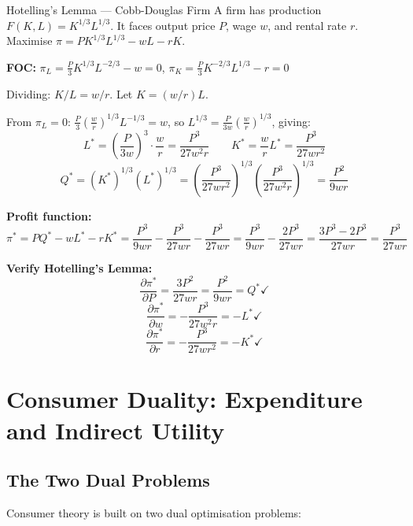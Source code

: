 \documentclass[12pt, a4paper]{article}
\theoremstyle{definition}
\newcommand{\pp}[2]{\dfrac{\partial #1}{\partial #2}}
\begin{document}
\begin{exbox}{Hotelling's Lemma --- Cobb-Douglas Firm}
A firm has production $F(K,L) = K^{1/3}L^{1/3}$. It faces output price $P$,
wage $w$, and rental rate $r$. Maximise $\pi = PK^{1/3}L^{1/3} - wL - rK$.

\textbf{FOC:}
$\pi_L = \frac{P}{3}K^{1/3}L^{-2/3} - w = 0$, \quad
$\pi_K = \frac{P}{3}K^{-2/3}L^{1/3} - r = 0$

Dividing: $K/L = w/r$. Let $K = (w/r)L$.

From $\pi_L=0$: $\frac{P}{3}\left(\frac{w}{r}\right)^{1/3}L^{-1/3} = w$,
so $L^{1/3} = \frac{P}{3w}\left(\frac{w}{r}\right)^{1/3}$,
giving:
\[
  L^* = \left(\frac{P}{3w}\right)^3 \cdot \frac{w}{r} = \frac{P^3}{27w^2 r}
  \qquad
  K^* = \frac{w}{r}L^* = \frac{P^3}{27wr^2}
\]
\[
  Q^* = (K^*)^{1/3}(L^*)^{1/3}
      = \left(\frac{P^3}{27wr^2}\right)^{1/3}\!\!\left(\frac{P^3}{27w^2r}\right)^{1/3}
      = \frac{P^2}{9wr}
\]

\textbf{Profit function:}
\[
  \pi^* = PQ^* - wL^* - rK^*
        = \frac{P^3}{9wr} - \frac{P^3}{27wr} - \frac{P^3}{27wr}
        = \frac{P^3}{9wr} - \frac{2P^3}{27wr}
        = \frac{3P^3 - 2P^3}{27wr}
        = \frac{P^3}{27wr}
\]

\textbf{Verify Hotelling's Lemma:}
\[
  \pp{\pi^*}{P} = \frac{3P^2}{27wr} = \frac{P^2}{9wr} = Q^* \checkmark
\]
\[
  \pp{\pi^*}{w} = -\frac{P^3}{27w^2r} = -L^* \checkmark
\]
\[
  \pp{\pi^*}{r} = -\frac{P^3}{27wr^2} = -K^* \checkmark
\]
\end{exbox}

\section{Consumer Duality: Expenditure and Indirect Utility}

\subsection{The Two Dual Problems}

Consumer theory is built on two dual optimisation problems:
\end{document}
